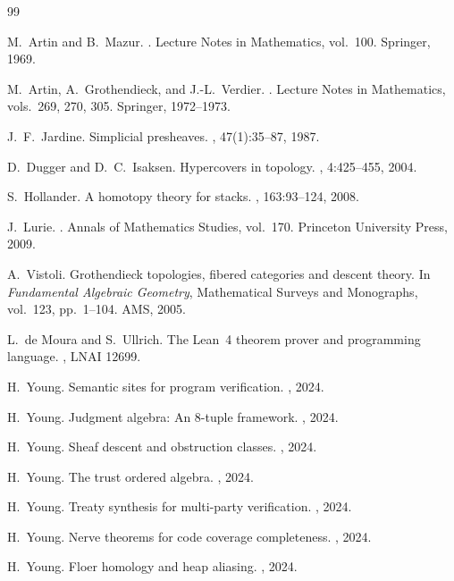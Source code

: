\documentclass[11pt]{article}
\begin{document}
\begin{thebibliography}{99}

M.~Artin and B.~Mazur.
.
\newblock Lecture Notes in Mathematics, vol.~100.
\newblock Springer, 1969.

M.~Artin, A.~Grothendieck, and J.-L.~Verdier.
.
\newblock Lecture Notes in Mathematics, vols.~269, 270, 305.
\newblock Springer, 1972--1973.

J.~F.~Jardine.
\newblock Simplicial presheaves.
, 47(1):35--87, 1987.

D.~Dugger and D.~C.~Isaksen.
\newblock Hypercovers in topology.
, 4:425--455, 2004.

S.~Hollander.
\newblock A homotopy theory for stacks.
, 163:93--124, 2008.

J.~Lurie.
.
\newblock Annals of Mathematics Studies, vol.~170.
\newblock Princeton University Press, 2009.

A.~Vistoli.
\newblock Grothendieck topologies, fibered categories and descent theory.
\newblock In {\em Fundamental Algebraic Geometry}, Mathematical Surveys and
  Monographs, vol.~123, pp.~1--104. AMS, 2005.

L.~de Moura and S.~Ullrich.
\newblock The {Lean~4} theorem prover and programming language.
, LNAI 12699.

H.~Young.
\newblock Semantic sites for program verification.
, 2024.

H.~Young.
\newblock Judgment algebra: An 8-tuple framework.
, 2024.

H.~Young.
\newblock Sheaf descent and obstruction classes.
, 2024.

H.~Young.
\newblock The trust ordered algebra.
, 2024.

H.~Young.
\newblock Treaty synthesis for multi-party verification.
, 2024.

H.~Young.
\newblock Nerve theorems for code coverage completeness.
, 2024.

H.~Young.
\newblock Floer homology and heap aliasing.
, 2024.

\end{thebibliography}
\end{document}
